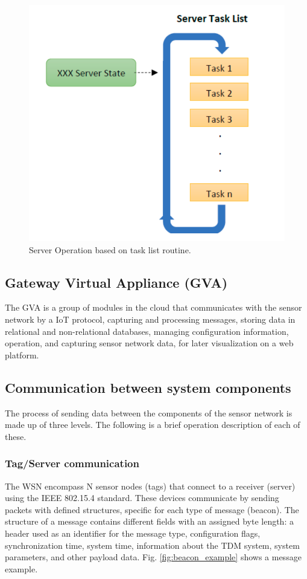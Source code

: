 \documentclass[journal]{IEEEtran}	%
\begin{document}
\begin{figure}[t!]
\centering
\includegraphics[width=0.8\columnwidth]{fig8.png}
\caption{Server Operation based on task list routine.}
\label{fig:server_tasks}
\end{figure}


\subsection{Gateway  Virtual  Appliance (GVA)}


The GVA is a group of modules in the cloud that communicates with the sensor network by a IoT protocol, capturing and processing messages, storing data in relational and non-relational databases, managing configuration information, operation, and capturing sensor network data, for later visualization on a web platform.


\subsection{Communication between system components}


The process of sending data between the components of the sensor network is made up of three levels. The following is a brief operation description of each of these.


\subsubsection{Tag/Server communication}
\label{sub:tag_server}


The WSN encompass N sensor nodes (tags) that connect to a receiver (server) using the IEEE 802.15.4 standard. These devices communicate by sending packets with defined structures, specific for each type of message (beacon). The structure of a message contains different fields with an assigned byte length: a header used as an identifier for the message type, configuration flags, synchronization time, system time, information about the TDM system, system parameters, and other payload data. Fig. \ref{fig:beacon_example} shows a message example.
\end{document}
